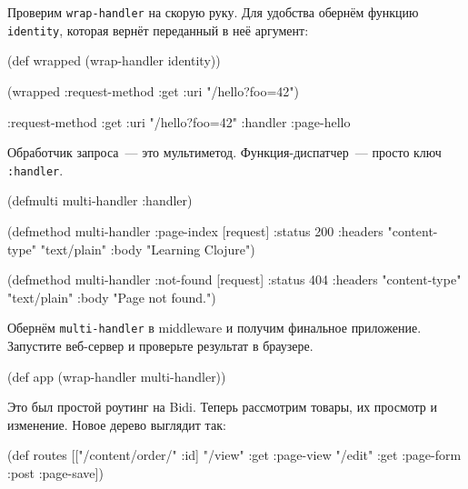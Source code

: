 Проверим \verb|wrap-handler| на скорую руку. Для удобства обернём функцию
\verb|identity|, которая вернёт переданный в неё аргумент:

\begin{english}
  \begin{clojure}
(def wrapped (wrap-handler identity))

(wrapped {:request-method :get
          :uri "/hello?foo=42"})

{:request-method :get
 :uri "/hello?foo=42"
 :handler :page-hello}
  \end{clojure}
\end{english}


Обработчик запроса~--- это мультиметод. Функция-диспатчер~--- просто ключ
\verb|:handler|.

\begin{english}
  \begin{clojure}
(defmulti multi-handler
  :handler)

(defmethod multi-handler :page-index
  [request]
  {:status 200
   :headers {"content-type" "text/plain"}
   :body "Learning Clojure"})

(defmethod multi-handler :not-found
  [request]
  {:status 404
   :headers {"content-type" "text/plain"}
   :body "Page not found."})
  \end{clojure}
\end{english}

Обернём \verb|multi-handler| в middleware и получим финальное
приложение. Запустите веб-сервер и проверьте результат в браузере.

\begin{english}
  \begin{clojure}
(def app (wrap-handler multi-handler))
  \end{clojure}
\end{english}

Это был простой роутинг на Bidi. Теперь рассмотрим товары, их
просмотр и изменение. Новое дерево выглядит так:

\begin{english}
  \begin{clojure}
(def routes
  [["/content/order/" :id] {"/view" {:get  :page-view}
                            "/edit" {:get  :page-form
                                     :post :page-save}}])
  \end{clojure}
\end{english}


